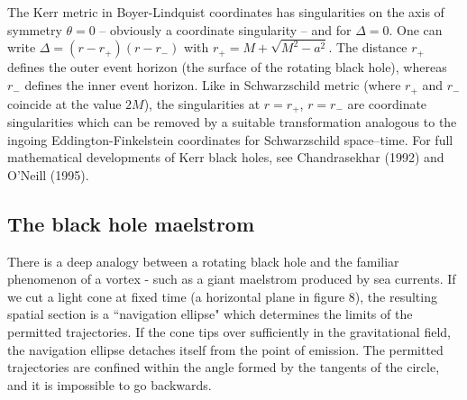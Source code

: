 \documentclass{lamuphys}
\begin{document}
The Kerr metric in Boyer-Lindquist coordinates has singularities on the axis
of symmetry $\theta = 0$ -- obviously a coordinate singularity -- and for $\Delta
= 0$. One can write $\Delta = (r-r_+)(r-r_-)$ with $r_+ = M +\sqrt{M^2 -
a^2}$. The distance $r_+$ defines the outer event horizon (the surface of the rotating
black hole), whereas $r_-$ defines the inner event horizon. 
Like in Schwarzschild metric (where $r_+$ and $r_-$ coincide at the value $2M$),
the singularities at $r=r_+$, $r=r_-$ are coordinate singularities which can be
removed by a suitable transformation analogous to the ingoing
Eddington-Finkelstein coordinates for Schwarzschild space--time. For full mathematical
developments of Kerr black holes, see Chandrasekhar (1992) and O'Neill (1995).
 
\subsection {The black hole maelstrom}

There is a deep analogy between a rotating black
hole and the familiar phenomenon of a vortex - such as a giant
maelstrom produced by sea currents. If we cut a light cone at fixed time (a
horizontal plane in figure 8), the resulting spatial section is a
``navigation ellipse" which determines the limits of the permitted
trajectories. If the cone tips over sufficiently in the gravitational
field, the navigation ellipse detaches itself from the point of emission. The
permitted trajectories are confined within the angle formed by the
tangents of the circle, and it is impossible to go backwards. 
    
\end{document}
